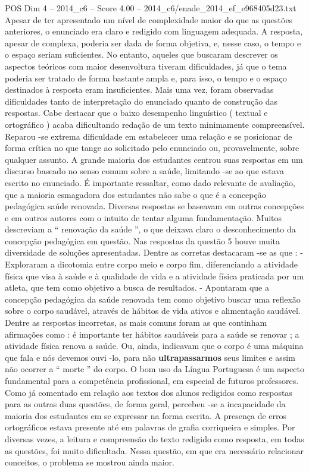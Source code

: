\begin{textsample}{POS Dim 4 – 2014\_c6 – Score 4.00 – 2014\_c6/enade\_2014\_ef\_e968405d23.txt}
Apesar de ter apresentado um nível de complexidade maior do que as questões anteriores, o enunciado era claro e redigido com linguagem adequada.
A resposta, apesar de complexa, poderia ser dada de forma objetiva, e, nesse caso, o tempo e o espaço seriam suficientes.
No entanto, aqueles que buscaram descrever os aspectos teóricos com maior desenvoltura tiveram dificuldades, já que o tema poderia ser tratado de forma bastante ampla e, para isso, o tempo e o espaço destinados à resposta eram insuficientes.
Mais uma vez, foram observadas dificuldades tanto de interpretação do enunciado quanto de construção das respostas.
Cabe destacar que o baixo desempenho linguístico ( textual e ortográfico ) acaba dificultando redação de um texto minimamente compreensível.
Reparou -se extrema dificuldade em estabelecer uma relação e se posicionar de forma crítica no que tange ao solicitado pelo enunciado ou, provavelmente, sobre qualquer assunto.
A grande maioria dos estudantes centrou suas respostas em um discurso baseado no senso comum sobre a saúde, limitando -se ao que estava escrito no enunciado.
É importante ressaltar, como dado relevante de avaliação, que a maioria esmagadora dos estudantes não sabe o que é a concepção pedagógica saúde renovada.
Diversas respostas se baseavam em outras concepções e em outros autores com o intuito de tentar alguma fundamentação.
Muitos descreviam a “ renovação da saúde ”, o que deixava claro o desconhecimento da concepção pedagógica em questão.
Nas respostas da questão 5 houve muita diversidade de soluções apresentadas.
Dentre as corretas destacaram -se as que : - Exploraram a dicotomia entre corpo meio e corpo fim, diferenciando a atividade física que visa à saúde e à qualidade de vida e a atividade física praticada por um atleta, que tem como objetivo a busca de resultados. - Apontaram que a concepção pedagógica da saúde renovada tem como objetivo buscar uma reflexão sobre o corpo saudável, através de hábitos de vida ativos e alimentação saudável.
Dentre as respostas incorretas, as mais comuns foram as que continham afirmações como : é importante ter hábitos saudáveis para a saúde se renovar ; a atividade física renova a saúde.
Ou, ainda, indicavam que o corpo é uma máquina que fala e nós devemos ouvi -lo, para não \textbf{ultrapassarmos} seus limites e assim não ocorrer a “ morte ” do corpo.
O bom uso da Língua Portuguesa é um aspecto fundamental para a competência profissional, em especial de futuros professores.
Como já comentado em relação aos textos dos alunos redigidos como respostas para as outras duas questões, de forma geral, percebeu -se a incapacidade da maioria dos estudantes em se expressar na forma escrita.
A presença de erros ortográficos estava presente até em palavras de grafia corriqueira e simples.
Por diversas vezes, a leitura e compreensão do texto redigido como resposta, em todas as questões, foi muito dificultada.
Nessa questão, em que era necessário relacionar conceitos, o problema se mostrou ainda maior.

\end{textsample}
